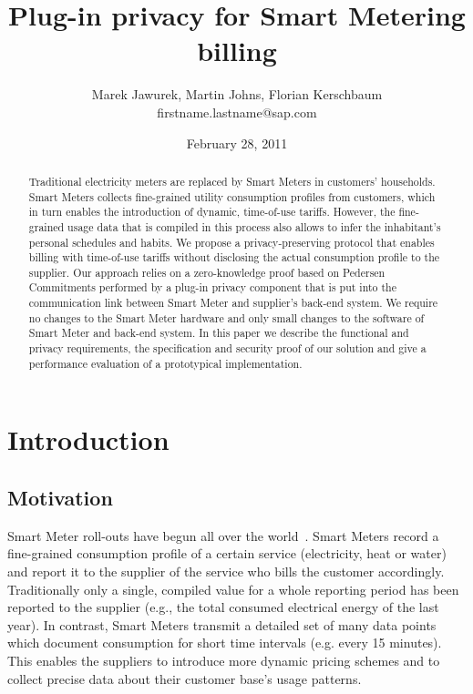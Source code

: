 \documentclass[english]{llncs}
\date{February 28, 2011}
\author{Marek Jawurek, Martin Johns, Florian Kerschbaum\\firstname.lastname@sap.com} \title{Plug-in privacy for Smart Metering billing}
\institute{SAP Research}
\begin{document}
 \maketitle


\begin{abstract} 
Traditional electricity meters are replaced by Smart Meters in customers' households.
Smart Meters collects fine-grained utility consumption profiles from customers, which in turn 
enables the introduction of dynamic, time-of-use tariffs.
However, the fine-grained usage data that is compiled in this process also allows to infer the inhabitant's personal schedules and habits. 
We propose a privacy-preserving protocol that enables billing with time-of-use tariffs without disclosing the actual consumption profile to the supplier.
Our approach relies on a zero-knowledge proof based on Pedersen Commitments performed by a plug-in privacy component that is put into the communication link between Smart Meter and supplier's back-end system.
We require no changes to the Smart Meter hardware and only small changes to the software of Smart Meter and back-end system.
In this paper we describe the functional and privacy requirements, the specification and security proof of our solution and give a performance evaluation of a prototypical implementation. 
\end{abstract}



\section{Introduction}
\label{introduction}

\subsection{Motivation}
Smart Meter roll-outs have begun all over the world~\cite{smartmetermap}.
Smart Meters record a fine-grained consumption profile of a certain service (electricity, heat or water) and report it to the supplier of the service who bills the customer accordingly.
Traditionally only a single, compiled value for a whole reporting period  has been reported to the supplier (e.g., the total consumed electrical energy of the last year). In contrast, Smart Meters transmit a detailed set of many data points which document consumption for short time intervals (e.g. every 15 minutes). This enables the suppliers to introduce more dynamic pricing schemes and to collect precise data about their customer base's usage patterns. 
\end{document}
